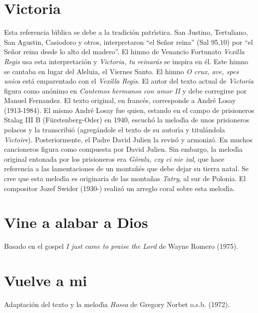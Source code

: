 \documentclass[landscape,12pt]{report}
\begin{document}
\section*{\small Victoria} \noindent\footnotesize Esta referencia b\'\i blica se debe a la tradici\'on patr\'\i stica. San Justino, Tertuliano, San Agustin, Casiodoro y otros, interpretaron ``el Se\~nor reina'' (Sal 95,10) por ``el Se\~nor reina desde lo alto del madero''. El himno de Venancio Fortunato \textit{Vexilla Regis} usa esta interpretaci\'on y \textit{Victoria, tu reinar\'as} se inspira en \'el. Este himno se cantaba en lugar del Aleluia, el Viernes Santo. El himno \textit{O crux, ave, spes unica} est\'a emparentado con el \textit{Vexilla Regis}. El autor del texto actual de \textit{Victoria} figura como an\'onimo en \textit{Cantemos hermanos con amor II} y debe corregirse por Manuel Fernandez. El texto original, en franc\'es, corresponde a Andr\'e Losay (1913-1984). El mismo Andr\'e Losay fue quien, estando en el campo de prisioneros Stalag III B (F\"urstenberg-Oder) en 1940, escuch\'o la melod\'\i a de unos prisioneros polacos y la transcribi\'o (agreg\'andole el texto de su autor\'\i a y titul\'
andola \emph{Victoire}). Posteriormente, el Padre David Julien la revis\'o y armoniz\'o. En muchos cancioneros figura como compuesta por David Julien. Sin embargo, la melod\'\i a original entonada por los prisioneros era \textit{G\'oralu, czy ci nie \.{z}al}, que hace referencia a las lamentaciones de un monta\~n\'es que debe dejar su tierra natal. Se cree que esta melod\'\i a es originaria de las monta\~nas \textit{Tatry}, al sur de Polonia. El compositor Jozef Swider (1930-) realiz\'o un arreglo coral sobre esta melod\'\i a.    
\section*{\small Vine a alabar a Dios} \noindent\footnotesize Basado en el gospel \textit{I just came to praise the Lord} de Wayne Romero (1975).
\section*{\small Vuelve a mi} \noindent\footnotesize Adaptaci\'on del texto y la melod\'\i a \textit{Hosea} de Gregory Norbet o.s.b. (1972).
\end{document}
